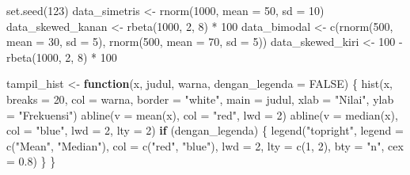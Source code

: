 \documentclass[
  indonesian,
  letterpaper,
]{book}
\newenvironment{Shaded}{\begin{snugshade}}{\end{snugshade}}
\newcommand{\AttributeTok}[1]{\textcolor[rgb]{0.40,0.45,0.13}{#1}}
\newcommand{\ConstantTok}[1]{\textcolor[rgb]{0.56,0.35,0.01}{#1}}
\newcommand{\ControlFlowTok}[1]{\textcolor[rgb]{0.00,0.23,0.31}{\textbf{#1}}}
\newcommand{\DecValTok}[1]{\textcolor[rgb]{0.68,0.00,0.00}{#1}}
\newcommand{\FloatTok}[1]{\textcolor[rgb]{0.68,0.00,0.00}{#1}}
\newcommand{\FunctionTok}[1]{\textcolor[rgb]{0.28,0.35,0.67}{#1}}
\newcommand{\NormalTok}[1]{\textcolor[rgb]{0.00,0.23,0.31}{#1}}
\newcommand{\OtherTok}[1]{\textcolor[rgb]{0.00,0.23,0.31}{#1}}
\newcommand{\SpecialCharTok}[1]{\textcolor[rgb]{0.37,0.37,0.37}{#1}}
\newcommand{\StringTok}[1]{\textcolor[rgb]{0.13,0.47,0.30}{#1}}
\begin{document}
\begin{Shaded}
\begin{Highlighting}[]
\FunctionTok{set.seed}\NormalTok{(}\DecValTok{123}\NormalTok{)}
\NormalTok{data\_simetris     }\OtherTok{\textless{}{-}} \FunctionTok{rnorm}\NormalTok{(}\DecValTok{1000}\NormalTok{, }\AttributeTok{mean =} \DecValTok{50}\NormalTok{, }\AttributeTok{sd =} \DecValTok{10}\NormalTok{)}
\NormalTok{data\_skewed\_kanan }\OtherTok{\textless{}{-}} \FunctionTok{rbeta}\NormalTok{(}\DecValTok{1000}\NormalTok{, }\DecValTok{2}\NormalTok{, }\DecValTok{8}\NormalTok{) }\SpecialCharTok{*} \DecValTok{100}
\NormalTok{data\_bimodal      }\OtherTok{\textless{}{-}} \FunctionTok{c}\NormalTok{(}\FunctionTok{rnorm}\NormalTok{(}\DecValTok{500}\NormalTok{, }\AttributeTok{mean =} \DecValTok{30}\NormalTok{, }\AttributeTok{sd =} \DecValTok{5}\NormalTok{), }\FunctionTok{rnorm}\NormalTok{(}\DecValTok{500}\NormalTok{, }\AttributeTok{mean =} \DecValTok{70}\NormalTok{, }\AttributeTok{sd =} \DecValTok{5}\NormalTok{))}
\NormalTok{data\_skewed\_kiri  }\OtherTok{\textless{}{-}} \DecValTok{100} \SpecialCharTok{{-}} \FunctionTok{rbeta}\NormalTok{(}\DecValTok{1000}\NormalTok{, }\DecValTok{2}\NormalTok{, }\DecValTok{8}\NormalTok{) }\SpecialCharTok{*} \DecValTok{100}

\NormalTok{tampil\_hist }\OtherTok{\textless{}{-}} \ControlFlowTok{function}\NormalTok{(x, judul, warna, }\AttributeTok{dengan\_legenda =} \ConstantTok{FALSE}\NormalTok{) \{}
\FunctionTok{hist}\NormalTok{(x, }\AttributeTok{breaks =} \DecValTok{20}\NormalTok{, }\AttributeTok{col =}\NormalTok{ warna, }\AttributeTok{border =} \StringTok{"white"}\NormalTok{, }\AttributeTok{main =}\NormalTok{ judul,}
\AttributeTok{xlab =} \StringTok{"Nilai"}\NormalTok{, }\AttributeTok{ylab =} \StringTok{"Frekuensi"}\NormalTok{)}
\FunctionTok{abline}\NormalTok{(}\AttributeTok{v =} \FunctionTok{mean}\NormalTok{(x),   }\AttributeTok{col =} \StringTok{"red"}\NormalTok{,  }\AttributeTok{lwd =} \DecValTok{2}\NormalTok{)}
\FunctionTok{abline}\NormalTok{(}\AttributeTok{v =} \FunctionTok{median}\NormalTok{(x), }\AttributeTok{col =} \StringTok{"blue"}\NormalTok{, }\AttributeTok{lwd =} \DecValTok{2}\NormalTok{, }\AttributeTok{lty =} \DecValTok{2}\NormalTok{)}
\ControlFlowTok{if}\NormalTok{ (dengan\_legenda) \{}
\FunctionTok{legend}\NormalTok{(}\StringTok{"topright"}\NormalTok{, }\AttributeTok{legend =} \FunctionTok{c}\NormalTok{(}\StringTok{"Mean"}\NormalTok{, }\StringTok{"Median"}\NormalTok{), }\AttributeTok{col =} \FunctionTok{c}\NormalTok{(}\StringTok{"red"}\NormalTok{, }\StringTok{"blue"}\NormalTok{),}
\AttributeTok{lwd =} \DecValTok{2}\NormalTok{, }\AttributeTok{lty =} \FunctionTok{c}\NormalTok{(}\DecValTok{1}\NormalTok{, }\DecValTok{2}\NormalTok{), }\AttributeTok{bty =} \StringTok{"n"}\NormalTok{, }\AttributeTok{cex =} \FloatTok{0.8}\NormalTok{)}
\NormalTok{\}}
\NormalTok{\}}


\end{Highlighting}
\end{Shaded}
\end{document}
